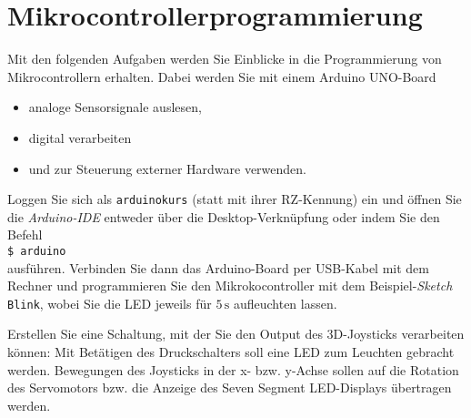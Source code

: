 \documentclass[12pt]{article}
\begin{document}





\part*{Mikrocontrollerprogrammierung}


Mit den folgenden Aufgaben werden Sie Einblicke in die Programmierung von Mikrocontrollern erhalten. Dabei werden Sie mit einem Arduino UNO-Board
\vspace*{-5pt}
\begin{itemize}
    \setlength\itemsep{-5pt}
    \item analoge Sensorsignale auslesen,
    \item digital verarbeiten
    \item und zur Steuerung externer Hardware verwenden.
\end{itemize}
\vspace*{1.0cm}







Loggen Sie sich als \texttt{arduinokurs} (statt mit ihrer RZ-Kennung) ein und öffnen Sie die \textit{Arduino-IDE} entweder über die Desktop-Verknüpfung oder indem Sie den Befehl\\

\hspace{1.0cm}\texttt{\$ arduino}\\

ausführen. Verbinden Sie dann das Arduino-Board per USB-Kabel mit dem Rechner und programmieren Sie den Mikrokocontroller mit dem Beispiel-\textit{Sketch} \texttt{Blink}, wobei Sie die LED jeweils für $5\,\mathrm{s}$ aufleuchten lassen.






Erstellen Sie eine Schaltung, mit der Sie den Output des 3D-Joysticks verarbeiten können: Mit Betätigen des Druckschalters soll eine LED zum Leuchten gebracht werden. Bewegungen des Joysticks in der x- bzw. y-Achse sollen auf die Rotation des Servomotors bzw. die Anzeige des Seven Segment LED-Displays übertragen werden.
\end{document}
